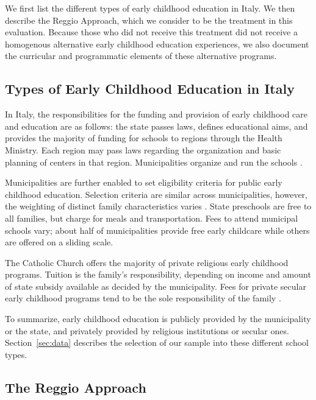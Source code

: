 We first list the different types of early childhood education in Italy. We then describe the Reggio Approach, which we consider to be the treatment in this evaluation. Because those who did not receive this treatment did not receive a homogenous alternative early childhood education experiences, we also document the curricular and programmatic elements of these alternative programs.

\subsection{Types of Early Childhood Education in Italy}

In Italy, the responsibilities for the funding and provision of early childhood care and education are as follows: the state passes laws, defines educational aims, and provides the majority of funding for schools to regions through the Health Ministry. Each region may pass laws regarding the organization and basic planning of centers in that region. Municipalities organize and run the schools \citep{Becchi-Ferrari_1990_Pub-Inf-Centres-Italy}. 

Municipalities are further enabled to set eligibility criteria for public early childhood education. Selection criteria are similar across municipalities, however, the weighting of distinct family characteristics varies \citep{Del-Boca-etal_2016_CESifo-ES}. State preschools are free to all families, but charge for meals and transportation. Fees to attend municipal schools vary; about half of municipalities provide free early childcare while others are offered on a sliding scale.

The Catholic Church offers the majority of private religious early childhood programs. Tuition is the family's responsibility, depending on income and amount of state subsidy available as decided by the municipality. Fees for private secular early childhood programs tend to be the sole responsibility of the family \citep{Hohnerlein_2009_Paradox-Public-Preschools}.

To summarize, early childhood education is publicly provided by the municipality or the state, and privately provided by religious institutions or secular ones. Section~\ref{sec:data} describes the selection of our sample into these different school types.

\subsection{The Reggio Approach}

